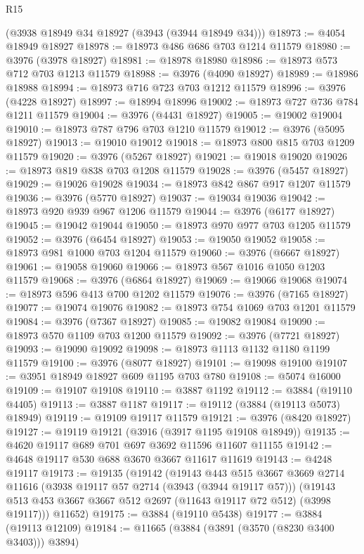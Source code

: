 \begin{lexlean}{R15}
\begin{coremodule}
    (@3938 @18949 @34 @18927 (@3943 (@3944 @18949 @34)))
@18973 := @4054 @18949 @18927
@18978 := @18973 @486 @686 @703 @1214 @11579
@18980 := @3976 (@3978 @18927)
@18981 := @18978 @18980
@18986 := @18973 @573 @712 @703 @1213 @11579
@18988 := @3976 (@4090 @18927)
@18989 := @18986 @18988
@18994 := @18973 @716 @723 @703 @1212 @11579
@18996 := @3976 (@4228 @18927)
@18997 := @18994 @18996
@19002 := @18973 @727 @736 @784 @1211 @11579
@19004 := @3976 (@4431 @18927)
@19005 := @19002 @19004
@19010 := @18973 @787 @796 @703 @1210 @11579
@19012 := @3976 (@5095 @18927)
@19013 := @19010 @19012
@19018 := @18973 @800 @815 @703 @1209 @11579
@19020 := @3976 (@5267 @18927)
@19021 := @19018 @19020
@19026 := @18973 @819 @838 @703 @1208 @11579
@19028 := @3976 (@5457 @18927)
@19029 := @19026 @19028
@19034 := @18973 @842 @867 @917 @1207 @11579
@19036 := @3976 (@5770 @18927)
@19037 := @19034 @19036
@19042 := @18973 @920 @939 @967 @1206 @11579
@19044 := @3976 (@6177 @18927)
@19045 := @19042 @19044
@19050 := @18973 @970 @977 @703 @1205 @11579
@19052 := @3976 (@6454 @18927)
@19053 := @19050 @19052
@19058 := @18973 @981 @1000 @703 @1204 @11579
@19060 := @3976 (@6667 @18927)
@19061 := @19058 @19060
@19066 := @18973 @567 @1016 @1050 @1203 @11579
@19068 := @3976 (@6864 @18927)
@19069 := @19066 @19068
@19074 := @18973 @596 @413 @700 @1202 @11579
@19076 := @3976 (@7165 @18927)
@19077 := @19074 @19076
@19082 := @18973 @754 @1069 @703 @1201 @11579
@19084 := @3976 (@7367 @18927)
@19085 := @19082 @19084
@19090 := @18973 @570 @1109 @703 @1200 @11579
@19092 := @3976 (@7721 @18927)
@19093 := @19090 @19092
@19098 := @18973 @1113 @1132 @1180 @1199 @11579
@19100 := @3976 (@8077 @18927)
@19101 := @19098 @19100
@19107 := @3951 @18949 @18927 @609 @1195 @703 @780
@19108 := @5074 @16000
@19109 := @19107 @19108
@19110 := @3887 @1192
@19112 := @3884 (@19110 @4405)
@19113 := @3887 @1187
@19117 := @19112 (@3884 (@19113 @5073) @18949)
@19119 := @19109 @19117 @11579
@19121 := @3976 (@8420 @18927)
@19127 := @19119 @19121 (@3916 (@3917 @1195 @19108 @18949))
@19135 := @4620 @19117 @689 @701 @697 @3692 @11596 @11607 @11155
@19142 := @4648 @19117 @530 @688 @3670 @3667 @11617 @11619
@19143 := @4248 @19117
@19173 := @19135
    (@19142
      (@19143
        @443
        @515
        @3667
        @3669
        @2714
        @11616
        (@3938 @19117 @57 @2714 (@3943 (@3944 @19117 @57)))
        (@19143 @513 @453 @3667 @3667 @512 @2697 (@11643 @19117 @72 @512) (@3998 @19117)))
      @11652)
@19175 := @3884 (@19110 @5438)
@19177 := @3884 (@19113 @12109)
@19184 := @11665 (@3884 (@3891 (@3570 (@8230 @3400 @3403))) @3894)

\end{coremodule}
\end{lexlean}
